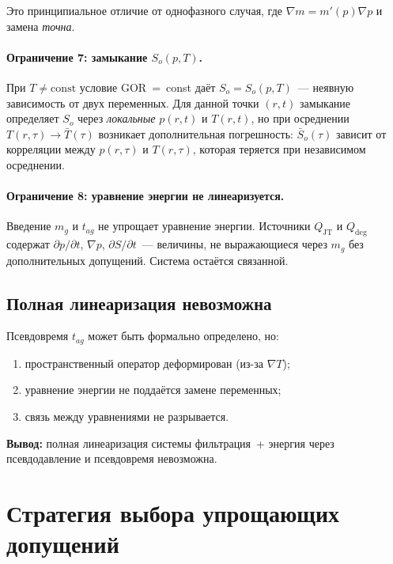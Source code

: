 \documentclass[12pt,a4paper]{article}
\begin{document}
Это принципиальное отличие от однофазного случая,
где $\nabla m = m'(p)\nabla p$ и замена \emph{точна}.

\paragraph{Ограничение 7: замыкание $S_o(p,T)$.}
При $T \neq \mathrm{const}$ условие GOR~=~const
даёт $S_o = S_o(p,T)$~--- неявную зависимость
от двух переменных. Для данной точки $(r,t)$
замыкание определяет $S_o$ через \emph{локальные}
$p(r,t)$ и $T(r,t)$, но при осреднении
$T(r,\tau) \to \bar{T}(\tau)$ возникает дополнительная
погрешность: $\bar{S}_o(\tau)$ зависит от корреляции
между $p(r,\tau)$ и $T(r,\tau)$, которая теряется
при независимом осреднении.

\paragraph{Ограничение 8: уравнение энергии не линеаризуется.}
Введение $m_g$ и $t_{ag}$ не упрощает уравнение энергии.
Источники $Q_{\mathrm{JT}}$ и $Q_{\mathrm{deg}}$
содержат $\partial p/\partial t$, $\nabla p$,
$\partial S/\partial t$~--- величины, не выражающиеся
через $m_g$ без дополнительных допущений.
Система остаётся связанной.

\subsection{Полная линеаризация невозможна}

Псевдовремя $t_{ag}$ может быть формально определено,
но:
\begin{enumerate}[nosep]
  \item пространственный оператор деформирован
        (из-за $\nabla T$);
  \item уравнение энергии не поддаётся замене переменных;
  \item связь между уравнениями не разрывается.
\end{enumerate}

\textbf{Вывод:} полная линеаризация системы
фильтрация~+ энергия через псевдодавление и псевдовремя
невозможна.


\section{Стратегия выбора упрощающих допущений}\label{sec:strategy}
\end{document}
